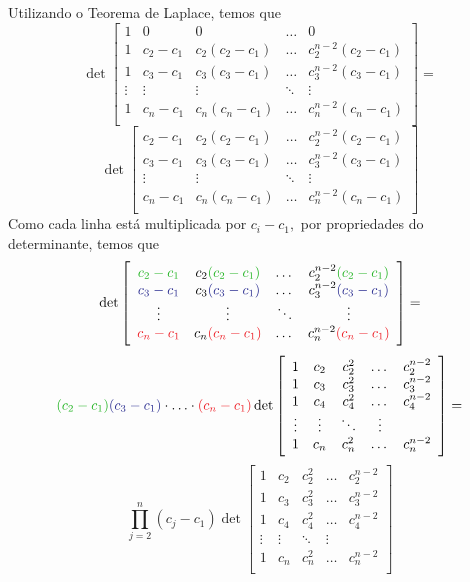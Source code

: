 \documentclass[11pt,a4paper]{article}
\begin{document}
{Utilizando o Teorema de Laplace, temos que
\[
\det \left[\begin{array}{c|cccc} 1 & 0 & 0 & \dots & 0\\ \hline 1 & c_2-c_1 & c_2(c_2-c_1) & \dots & c_2^{n-2}(c_2-c_1)\\ 1 & c_3-c_1 & c_3(c_3-c_1) & \dots & c_3^{n-2}(c_3-c_1)\\ \vdots & \vdots & \vdots & \ddots &\vdots \\ 1 & c_n-c_1 & c_n(c_n-c_1) & \dots & c_n^{n-2}(c_n-c_1)\\ \end{array}\right] =\]\[ \det \left[\begin{array}{cccc}   c_2-c_1 & c_2(c_2-c_1) & \dots & c_2^{n-2}(c_2-c_1)\\  c_3-c_1 & c_3(c_3-c_1) & \dots & c_3^{n-2}(c_3-c_1)\\  \vdots & \vdots & \ddots &\vdots \\ c_n-c_1 & c_n(c_n-c_1) & \dots & c_n^{n-2}(c_n-c_1)\\ \end{array}\right]
\]
Como cada linha está multiplicada por $c_i - c_1,$ por propriedades do determinante, temos que
\[
\det \left[\begin{array}{cccc}   \textcolor{Verde}{c_2-c_1} & c_2\textcolor{Verde}{(c_2-c_1)} & \dots & c_2^{n-2}\textcolor{Verde}{(c_2-c_1)}\\  \textcolor{Blue}{c_3-c_1} & c_3\textcolor{Blue}{(c_3-c_1)} & \dots & c_3^{n-2}\textcolor{Blue}{(c_3-c_1)}\\  \vdots & \vdots & \ddots &\vdots \\ \textcolor{Red}{c_n-c_1} & c_n\textcolor{Red}{(c_n-c_1)} & \dots & c_n^{n-2}\textcolor{Red}{(c_n-c_1)}\\ \end{array}\right] =\]\[
\textcolor{Verde}{(c_2-c_1)}\textcolor{Blue}{(c_3-c_1)} \cdot \ldots \cdot  \textcolor{Red}{(c_n-c_1)}  \det \left[\begin{array}{ccccc}   1& c_2 & c_2^2 & \dots & c_2^{n-2}\\  1 & c_3 & c_3^2 & \dots & c_3^{n-2} \\  1 & c_4 & c_4^2 & \dots & c_4^{n-2}\\  \vdots & \vdots & \ddots &\vdots \\ 1 & c_n & c_n^2 & \dots & c_n^{n-2}\\ \end{array}\right] = \]\[
\prod\limits_{j = 2}^n (c_j - c_1)  \det \left[\begin{array}{ccccc}   1& c_2 & c_2^2 & \dots & c_2^{n-2}\\  1 & c_3 & c_3^2 & \dots & c_3^{n-2} \\  1 & c_4 & c_4^2 & \dots & c_4^{n-2}\\  \vdots & \vdots & \ddots &\vdots \\ 1 & c_n & c_n^2 & \dots & c_n^{n-2}\\ \end{array}\right] 
\]}
\end{document}
